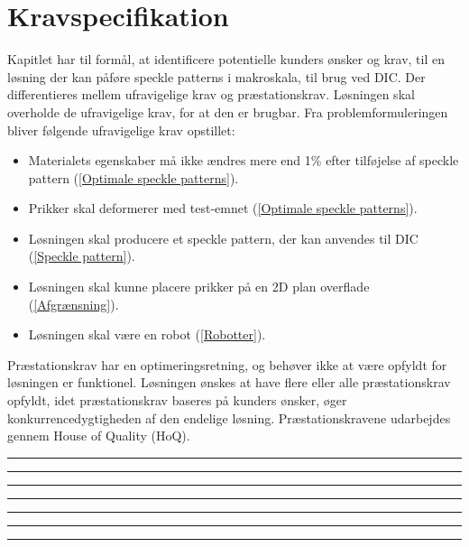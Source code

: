 \chapter{Kravspecifikation} \label{Kravspecifikation}

Kapitlet har til formål, at identificere potentielle kunders ønsker og krav, til en løsning der kan påføre speckle patterns i makroskala, til brug ved DIC. Der differentieres mellem ufravigelige krav og præstationskrav. Løsningen skal overholde de ufravigelige krav, for at den er brugbar. Fra problemformuleringen bliver følgende ufravigelige krav opstillet:
\begin{itemize}
    \item Materialets egenskaber må ikke ændres mere end 1\% efter tilføjelse af speckle pattern (\ref{Optimale speckle patterns}).
    \item Prikker skal deformerer med test-emnet (\ref{Optimale speckle patterns}).
    \item Løsningen skal producere et speckle pattern, der kan anvendes til DIC (\ref{Speckle pattern}).
    \item Løsningen skal kunne placere prikker på en 2D plan overflade (\ref{Afgrænsning}). 
    \item Løsningen skal være en robot (\ref{Robotter}).
\end{itemize}

Præstationskrav har en optimeringsretning, og behøver ikke at være opfyldt for løsningen er funktionel. Løsningen ønskes at have flere eller alle præstationskrav opfyldt, idet præstationskrav baseres på kunders ønsker, øger konkurrencedygtigheden af den endelige løsning. Præstationskravene udarbejdes gennem House of Quality (HoQ).

\plainbreak{2}

\plainbreak{2}
 \plainbreak{2}

\plainbreak{2}

\plainbreak{2}

\plainbreak{2}

\plainbreak{2}



